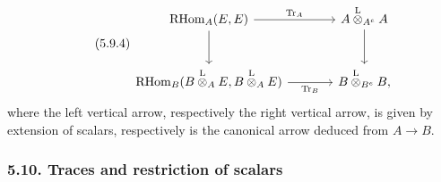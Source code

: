 \documentclass[11pt]{article}
\providecommand{\RHom}{\mathrm{RHom}}
\providecommand{\Tr}{\operatorname{Tr}}
\providecommand{\Tr}{\operatorname{Tr}}
\providecommand{\lten}{\overset{\mathrm L}{\otimes}}
\providecommand{\Tr}{\operatorname{Tr}}
\providecommand{\RHom}{\mathrm{RHom}}
\providecommand{\lten}{\overset{\mathrm L}{\otimes}}
\providecommand{\RHom}{\mathrm R\mathcal{H}om}
\providecommand{\lten}{\overset{\mathrm L}{\otimes}}
\providecommand{\Tr}{\operatorname{Tr}}
\providecommand{\lten}{\overset{\mathrm L}{\otimes}}
\providecommand{\lten}{\overset{\mathrm L}{\otimes}}
\providecommand{\lten}{\overset{\mathrm L}{\otimes}}
\providecommand{\RHom}{\mathrm{RHom}}
\begin{document}
\begin{equation}\tag{5.9.4}
\begin{tikzcd}[column sep=large,row sep=large]
\RHom_A(E,E) \arrow[r,"\Tr_A"] \arrow[d] & A\lten_{A^e}A \arrow[d]\\
\RHom_B(B\lten_AE,B\lten_AE) \arrow[r,"\Tr_B"'] & B\lten_{B^e}B,
\end{tikzcd}
\end{equation}
where the left vertical arrow, respectively the right vertical arrow, is given by extension of scalars, respectively is the canonical arrow deduced from $A\to B$.

\subsubsection*{5.10. Traces and restriction of scalars}
\end{document}
